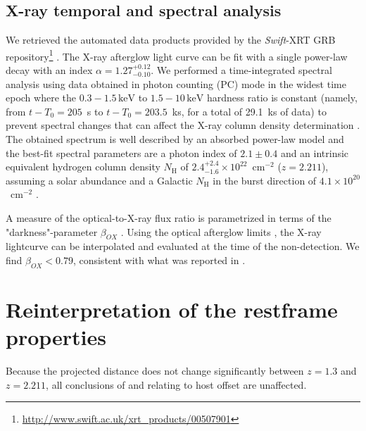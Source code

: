 \documentclass{aa}    %
\begin{document}
\subsection{X-ray temporal and spectral analysis}\label{xray}

We retrieved the automated data products provided by the \textit{Swift}-XRT GRB
repository\footnote{\url{http://www.swift.ac.uk/xrt\_products/00507901}}
\citep{Evans2009}. 
The X-ray afterglow light curve can be fit with a single power-law decay with an
index $\alpha=1.27_{-0.10}^{+0.12}$. We performed a time-integrated spectral
analysis using data obtained in photon counting (PC) mode in the widest time epoch where
the $0.3-1.5\,\mathrm{keV}$ to $1.5-10\,\mathrm{keV}$ hardness ratio is constant
(namely, from $t-T_0 = 205$~s to $t-T_0 = 203.5$~ks, for a total of 29.1~ks of
data) to prevent spectral changes that can affect the X-ray column density
determination \citep{Kopac2012}. 
The obtained spectrum is well described by an absorbed power-law
model and the best-fit spectral parameters are a photon index of $2.1 \pm 0.4$ and
an intrinsic equivalent hydrogen column density $N_{\mathrm{H}}$ of $2.4_{-1.6}^{+2.4}
\times 10^{22}$~cm$^{-2}$ ($z=2.211$), assuming a solar abundance and a Galactic $N_{\mathrm{H}}$ in
the burst direction of $4.1 \times 10^{20}$~cm$^{-2}$ \citep{Willingale2013}.

A measure of the optical-to-X-ray flux ratio is parametrized in terms of the
"darkness"-parameter $\beta_{OX} $ \citep{Jakobsson2004}. Using the optical
afterglow limits \citep{Cucchiara2011, Cenko2011}, the X-ray lightcurve can be
interpolated and evaluated at the time of the non-detection. We find $\beta_{OX}
< 0.79$, consistent with what was reported in \citet{Sakamoto2013}.
\section{Reinterpretation of the restframe properties}

Because the projected distance does not change significantly between $z = 1.3$ and $z =
2.211$, all conclusions of \citet{Margutti2012} and \citet{Sakamoto2013}
relating to host offset are unaffected.

\end{document}

